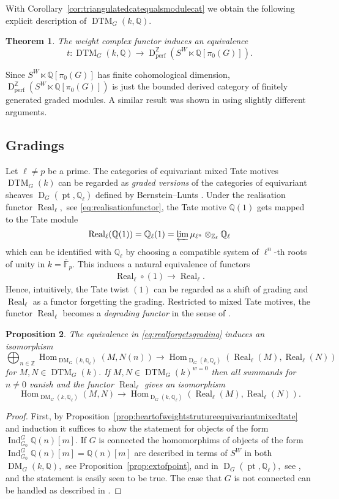 \documentclass{amsart}
\theoremstyle{plain}
\newtheorem{theorem}{Theorem}[section]
\newtheorem{proposition}[theorem]{Proposition}
\theoremstyle{TheoremNum}
\theoremstyle{definition}
\theoremstyle{remark}
\numberwithin{equation}{section}
\newcommand{\F}{\mathbb{F}}
\newcommand{\Q}{\mathbb{Q}}
\newcommand{\Z}{\mathbb{Z}}
\newcommand{\DM}{\operatorname{DM}}
\newcommand{\DTM}{\operatorname{DTM}}
\newcommand{\DperfZ}{\operatorname{D}^\Z_{\operatorname{perf}}}
\newcommand{\Hom}{\operatorname{Hom}}
\newcommand{\Ind}{\operatorname{Ind}}
\newcommand{\poi}{\operatorname{pt}}
\newcommand{\Real}{\operatorname{Real}}
\newcommand{\DerG}{\operatorname{D}}
\begin{document}
With Corollary~\ref{cor:triangulatedcatequalsmodulecat} we obtain the following explicit description of $\DTM_G(k,\Q).$
\begin{theorem}
The weight complex functor induces an equivalence
$$t: \DTM_G(k,\Q)\to\DperfZ(S^W\ltimes \Q[\pi_0(G)]).$$
\end{theorem}
Since $S^W\ltimes \Q[\pi_0(G)]$ has finite cohomological dimension,  $\DperfZ(S^W\ltimes \Q[\pi_0(G)])$ is just the bounded derived category of finitely generated graded modules. A similar result was shown in \cite[Theorem II.3.1]{soergel_equivariant_2018} using slightly different arguments.
\subsection{Gradings} Let $\ell\neq p$ be a prime. The categories of equivariant mixed Tate motives $\DTM_G(k)$ can be regarded as \emph{graded versions} of the categories of equivariant sheaves $\DerG_G(\poi,\Q_\ell)$ defined by  Bernstein--Lunts \cite{bernstein_equivariant_1994}.
Under the realisation functor $\Real_\ell,$ see \eqref{eq:realisationfunctor}, the Tate motive $\Q(1)$ gets mapped to the Tate module
$$\Real_\ell(\Q(1))=\Q_\ell(1)=\varprojlim \mu_{\ell^n}\otimes_{\Z_\ell}\Q_\ell$$
which can be identified with $\Q_\ell$ by choosing a compatible system of $\ell^n$-th roots of unity in $k=\overline{\F}_p.$ This induces a natural equivalence of functors
\begin{align}
    \Real_\ell\circ (1)\to\Real_\ell.\label{eq:realforgetsgrading}
\end{align}
Hence, intuitively, the Tate twist $(1)$ can be regarded as a shift of grading and $\Real_\ell$ as a functor forgetting the grading. Restricted to mixed Tate motives, the functor $\Real_\ell$ becomes a \emph{degrading functor} in the sense of \cite[Section 4.3]{beilinson_koszul_1996}.
\begin{proposition}\label{prop:puretateonpointgrading}
The equivalence in \eqref{eq:realforgetsgrading} induces an isomorphism
$$\bigoplus_{n\in\Z}\Hom_{\DM_G(k,\Q_\ell)}(M,N(n))\to \Hom_{\DerG_G(k,\Q_\ell)}(\Real_\ell(M),\Real_\ell(N))$$ for $M,N\in \DTM_G(k).$ 
If $M,N\in\DTM_G(k)^{w=0}$ then all summands for $n\neq 0$ vanish and the functor $\Real_\ell$ gives an isomorphism
$$\Hom_{\DM_G(k,\Q_\ell)}(M,N)\to \Hom_{\DerG_G(k,\Q_\ell)}(\Real_\ell(M),\Real_\ell(N)).$$
\end{proposition}
\begin{proof} First, by Proposition~\ref{prop:heartofweightstrutureequivariantmixedtate} and induction it suffices to show the statement for objects of the form $\Ind_{G_0}^G\Q(n)[m].$ If $G$ is connected
the homomorphims of objects of the form $\Ind_{G_0}^G\Q(n)[m]=\Q(n)[m]$ are described in terms of $S^W$ in both $\DM_G(k,\Q),$ see Proposition~\ref{prop:extofpoint}, and in $\DerG_G(\poi,\Q_\ell),$ see \cite[Section 13.10]{bernstein_equivariant_1994}, and the statement is easily seen to be true. The case that $G$ is not connected can be handled as described in \cite[Theorem A.2.8]{soergel_equivariant_2018}.
\end{proof}
\end{document}
